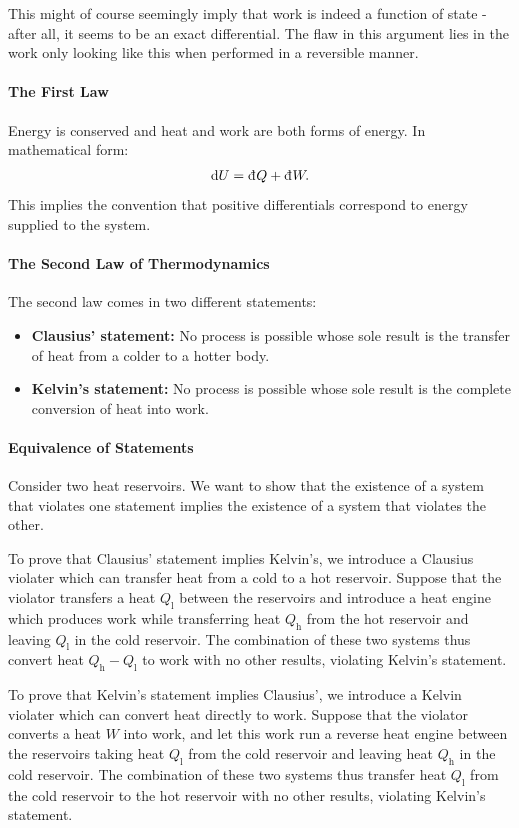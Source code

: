 This might of course seemingly imply that work is indeed a function of state - after all, it seems to be an exact differential. The flaw in this argument lies in the work only looking like this when performed in a reversible manner.

\paragraph{The First Law}
Energy is conserved and heat and work are both forms of energy. In mathematical form:
\begin{align*}
\dd{U} = \din{Q} + \din{W}.
\end{align*}
This implies the convention that positive differentials correspond to energy supplied to the system.

\paragraph{The Second Law of Thermodynamics}
The second law comes in two different statements:
\begin{itemize}
	\item \textbf{Clausius' statement:} No process is possible whose sole result is the transfer of heat from a colder to a hotter body.
	\item \textbf{Kelvin's statement:} No process is possible whose sole result is the complete conversion of heat into work.
\end{itemize}

\paragraph{Equivalence of Statements}
Consider two heat reservoirs. We want to show that the existence of a system that violates one statement implies the existence of a system that violates the other.

To prove that Clausius' statement implies Kelvin's, we introduce a Clausius violater which can transfer heat from a cold to a hot reservoir. Suppose that the violator transfers a heat $Q_{\text{l}}$ between the reservoirs and introduce a heat engine which produces work while transferring heat $Q_{\text{h}}$ from the hot reservoir and leaving $Q_{\text{l}}$ in the cold reservoir. The combination of these two systems thus convert heat $Q_{\text{h}} - Q_{\text{l}}$ to work with no other results, violating Kelvin's statement.

To prove that Kelvin's statement implies Clausius', we introduce a Kelvin violater which can convert heat directly to work. Suppose that the violator converts a heat $W$ into work, and let this work run a reverse heat engine between the reservoirs taking heat $Q_{\text{l}}$ from the cold reservoir and leaving heat $Q_{\text{h}}$ in the cold reservoir. The combination of these two systems thus transfer heat $Q_{\text{l}}$ from the cold reservoir to the hot reservoir with no other results, violating Kelvin's statement.

